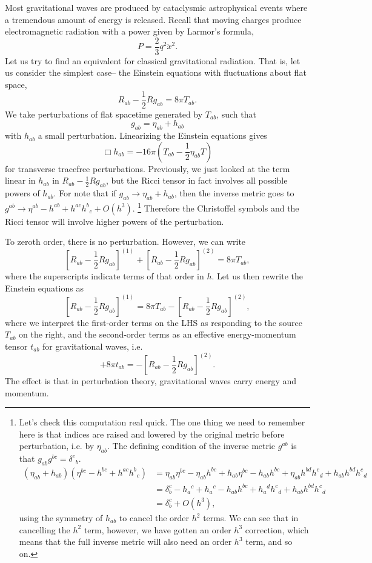 Most gravitational waves are produced by cataclysmic astrophysical events where a tremendous amount of energy is released. Recall that moving charges produce electromagnetic radiation with a power given by Larmor's formula,
$$P=\frac{2}{3}q^2 \ddot x^2.$$
Let us try to find an equivalent for classical gravitational radiation. That is, let us consider the simplest case-- the Einstein equations with fluctuations about flat space,
$$R_{ab}-\frac{1}{2}Rg_{ab}=8\pi T_{ab}.$$
We take perturbations of flat spacetime generated by $T_{ab}$, such that
$$g_{ab}=\eta_{ab}+h_{ab}$$ with $h_{ab}$ a small perturbation. Linearizing the Einstein equations gives
$$\Box h_{ab}=-16\pi(T_{ab}-\frac{1}{2}\eta_{ab} T)$$
for transverse tracefree perturbations. Previously, we just looked at the term linear in $h_{ab}$ in $R_{ab}-\frac{1}{2}Rg_{ab}$, but the Ricci tensor in fact involves all possible powers of $h_{ab}$. For note that if $g_{ab}\to \eta_{ab}+h_{ab}$, then the inverse metric goes to $g^{ab}\to \eta^{ab}-h^{ab}+h^{ac}h^b{}_c +O(h^3)$.%
    \footnote{Let's check this computation real quick. The one thing we need to remember here is that indices are raised and lowered by the original metric before perturbation, i.e. by $\eta_{ab}$. The defining condition of the inverse metric $g^{ab}$ is that $g_{ab}g^{bc}=\delta^c{}_b.$
    \begin{align*}
        (\eta_{ab}+h_{ab})(\eta^{bc}-h^{bc} +h^{ac}h^b{}_c)
            &= \eta_{ab}\eta^{bc}-\eta_{ab} h^{bc}+h_{ab}\eta^{bc}-h_{ab} h^{bc}+\eta_{ab} h^{bd} h^c{}_d +h_{ab} h^{bd} h^c{}_d\\
            &= \delta^c_b - h_a{}^c +h_a{}^c -h_{ab} h^{bc} +h_a{}^d h^c{}_d + h_{ab}h^{bd}h^c{}_d\\
            &= \delta^c_b +O(h^3),
    \end{align*}
    using the symmetry of $h_{ab}$ to cancel the order $h^2$ terms. We can see that in cancelling the $h^2$ term, however, we have gotten an order $h^3$ correction, which means that the full inverse metric will also need an order $h^3$ term, and so on.
    }
Therefore the Christoffel symbols and the Ricci tensor will involve higher powers of the perturbation.

To zeroth order, there is no perturbation. However, we can write
$$[R_{ab}-\frac{1}{2}Rg_{ab}]^{(1)}+[R_{ab}-\frac{1}{2}Rg_{ab}]^{(2)}=8\pi T_{ab},$$
where the superscripts indicate terms of that order in $h$. Let us then rewrite the Einstein equations as
$$[R_{ab}-\frac{1}{2}Rg_{ab}]^{(1)}=8\pi T_{ab}-[R_{ab}-\frac{1}{2}Rg_{ab}]^{(2)},$$
where we interpret the first-order terms on the LHS as responding to the source $T_{ab}$ on the right, and the second-order terms as an effective energy-momentum tensor $t_{ab}$ for gravitational waves, i.e.
$$+8\pi t_{ab}=-[R_{ab}-\frac{1}{2}R g_{ab}]^{(2)}.$$
The effect is that in perturbation theory, gravitational waves carry energy and momentum.

